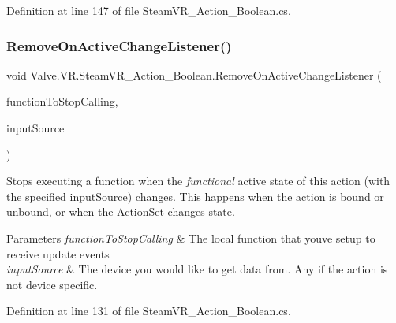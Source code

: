 Definition at line 147 of file Steam\+V\+R\+\_\+\+Action\+\_\+\+Boolean.\+cs.

\mbox{\label{class_valve_1_1_v_r_1_1_steam_v_r___action___boolean_ab3b1adf6bf7cab23db177230d68ea943}} 
\subsubsection{\texorpdfstring{RemoveOnActiveChangeListener()}{RemoveOnActiveChangeListener()}}
{\footnotesize\ttfamily void Valve.\+V\+R.\+Steam\+V\+R\+\_\+\+Action\+\_\+\+Boolean.\+Remove\+On\+Active\+Change\+Listener (\begin{DoxyParamCaption}\item[{\mbox{\hyperlink{class_valve_1_1_v_r_1_1_steam_v_r___action___boolean_af9f3044d5e4868485945b70d907c6bbb}{Active\+Change\+Handler}}}]{function\+To\+Stop\+Calling,  }\item[{\mbox{\hyperlink{namespace_valve_1_1_v_r_a82e5bf501cc3aa155444ee3f0662853f}{Steam\+V\+R\+\_\+\+Input\+\_\+\+Sources}}}]{input\+Source }\end{DoxyParamCaption})}



Stops executing a function when the {\itshape functional} active state of this action (with the specified input\+Source) changes. This happens when the action is bound or unbound, or when the Action\+Set changes state. 


\begin{DoxyParams}{Parameters}
{\em function\+To\+Stop\+Calling} & The local function that you\textquotesingle{}ve setup to receive update events\\
\hline
{\em input\+Source} & The device you would like to get data from. Any if the action is not device specific.\\
\hline
\end{DoxyParams}


Definition at line 131 of file Steam\+V\+R\+\_\+\+Action\+\_\+\+Boolean.\+cs.

\mbox{\label{class_valve_1_1_v_r_1_1_steam_v_r___action___boolean_ac298fc72527d85d9331a214ac08113ed}} 
